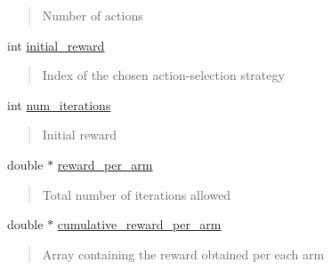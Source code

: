 \begin{DoxyCompactItemize}
\begin{DoxyCompactList}
\begin{quote}
Number of actions \end{quote}
\end{DoxyCompactList}\item 
\mbox{\label{classMultiArmedBandit_abf1a430a6e9bd2899028ea3369a203ff}} 
int \hyperlink{classMultiArmedBandit_abf1a430a6e9bd2899028ea3369a203ff}{initial\+\_\+reward}
\begin{DoxyCompactList}\small\item\em \begin{quote}
Index of the chosen action-\/selection strategy \end{quote}
\end{DoxyCompactList}\item 
\mbox{\label{classMultiArmedBandit_a0ddfdfc3b16fa8111c3646170b4be51e}} 
int \hyperlink{classMultiArmedBandit_a0ddfdfc3b16fa8111c3646170b4be51e}{num\+\_\+iterations}
\begin{DoxyCompactList}\small\item\em \begin{quote}
Initial reward \end{quote}
\end{DoxyCompactList}\item 
\mbox{\label{classMultiArmedBandit_a17bda7a04e80f18180d569946a2f06a6}} 
double $\ast$ \hyperlink{classMultiArmedBandit_a17bda7a04e80f18180d569946a2f06a6}{reward\+\_\+per\+\_\+arm}
\begin{DoxyCompactList}\small\item\em \begin{quote}
Total number of iterations allowed \end{quote}
\end{DoxyCompactList}\item 
\mbox{\label{classMultiArmedBandit_a2ad1ef925f4642e008233ea9d9aa06a7}} 
double $\ast$ \hyperlink{classMultiArmedBandit_a2ad1ef925f4642e008233ea9d9aa06a7}{cumulative\+\_\+reward\+\_\+per\+\_\+arm}
\begin{DoxyCompactList}\small\item\em \begin{quote}
Array containing the reward obtained per each arm \end{quote}
\end{DoxyCompactList}\item 

\end{DoxyCompactItemize}
